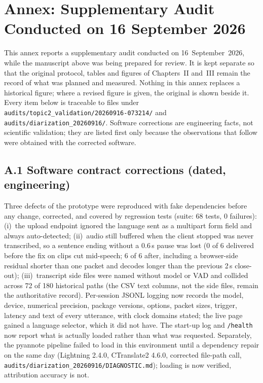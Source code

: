 \section*{Annex: Supplementary Audit Conducted on 16 September 2026}
{}

This annex reports a supplementary audit conducted on 16~September~2026, while the manuscript above was being prepared for review. It is kept separate so that the
original protocol, tables and figures of Chapters~II and~III remain the record of what was planned and
measured. Nothing in this annex replaces a historical figure; where a revised figure is given, the original is
shown beside it. Every item below is traceable to files under
\texttt{audits/topic2\_validation/20260916-073214/} and \texttt{audits/diarization\_20260916/}.
Software corrections are engineering facts, not scientific validation; they are listed first only because the
observations that follow were obtained with the corrected software.

\subsection*{A.1 Software contract corrections (dated, engineering)}
Three defects of the prototype were reproduced with fake dependencies before any change, corrected, and covered
by regression tests (suite: 68 tests, 0 failures): (i)~the upload endpoint ignored the language sent as a
multipart form field and always auto-detected; (ii)~audio still buffered when the client stopped was never
transcribed, so a sentence ending without a $0.6$\,s pause was lost (0 of 6 delivered before the fix on clips
cut mid-speech; 6 of 6 after, including a browser-side residual shorter than one packet and decodes longer than
the previous 2\,s close-out); (iii)~transcript side files were named without model or VAD and collided across
72 of 180 historical paths (the CSV text columns, not the side files, remain the authoritative record).
Per-session JSONL logging now records the model, device, numerical precision, package versions, options,
packet sizes, trigger, latency and text of every utterance, with clock domains stated; the live page gained a
language selector, which it did not have. The start-up log and \texttt{/health} now report what is actually
loaded rather than what was requested. Separately, the pyannote pipeline failed to load in this environment
until a dependency repair on the same day (Lightning 2.4.0, CTranslate2 4.6.0, corrected file-path call,
\texttt{audits/diarization\_20260916/DIAGNOSTIC.md}); loading is now verified, attribution accuracy is not.

